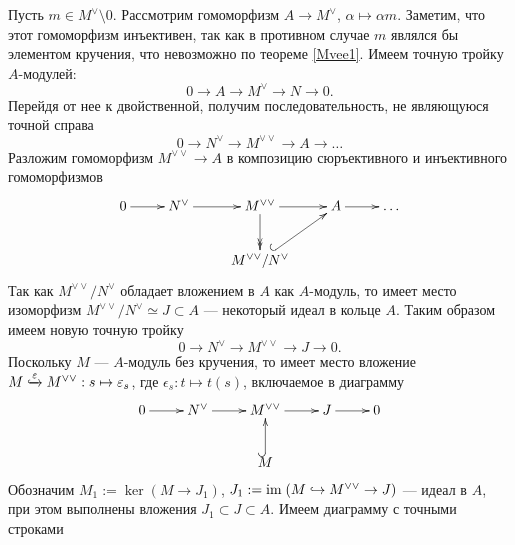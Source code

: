    Пусть $m \in M^{\vee} \setminus 0$. Рассмотрим гомоморфизм $A \rightarrow M^\vee$, $\alpha \mapsto \alpha m$.
    Заметим, что этот гомоморфизм инъективен, так как в противном случае $m$ являлся бы элементом 
    кручения, что невозможно по теореме \ref{Mvee1}. Имеем точную тройку $A$-модулей:
    \begin{equation*}
        0 \rightarrow A \rightarrow M^\vee \rightarrow N \rightarrow 0.
    \end{equation*}
    Перейдя от нее к двойственной, получим последовательность, не являющуюся точной справа
    \begin{equation*}
        0 \rightarrow N^\vee \rightarrow M^{\vee \vee} \rightarrow A \rightarrow \dots
    \end{equation*}
    Разложим гомоморфизм $M^{\vee \vee} \rightarrow A$ в композицию сюръективного и инъективного 
    гомоморфизмов
    \begin{equation*}
        \xymatrix{
            0 \ar[r]
            &N^\vee \ar[r] 
            &M^{\vee \vee} \ar[r] \ar@{>>}[d]
            &A \ar[r]
            &\dots \\
            &
            &
            M^{\vee \vee} / N^\vee \ar@{^{(}->}[ru]
        }
    \end{equation*}
    Так как $ M^{\vee \vee} / N^\vee$ обладает вложением в $A$ как $A$-модуль, то имеет место 
    изоморфизм  $ M^{\vee \vee} / N^\vee \simeq J \subset A$ --- некоторый идеал в кольце $A$. Таким 
    образом имеем новую точную тройку
    \begin{equation*}
        0 \rightarrow N^\vee \rightarrow M^{\vee \vee} \rightarrow J \rightarrow 0.
    \end{equation*}
    Поскольку $M$ --- $A$-модуль без кручения, то имеет место вложение \linebreak
    $ M \lhook\joinrel\xrightarrow{\epsilon} M^{\vee \vee} : s \mapsto \epsilon_s$, где $\epsilon_s : t \mapsto t(s)$, 
    включаемое в диаграмму
    \begin{equation*}
        \xymatrix{
            0 \ar[r]
            &N^\vee \ar[r] 
            &M^{\vee \vee} \ar[r] 
            &J \ar[r]
            &0\\
            &
            &M \ar@{^{(}->}[u]
        }
    \end{equation*}
    Обозначим $M_1 := \ker(M \rightarrow J_1)$, $J_1 := \textup{im\;}(M \hookrightarrow M^{\vee \vee} \rightarrow J)$ --- 
    идеал в $A$, при этом выполнены вложения $J_1 \subset J \subset A$. 
    Имеем диаграмму с точными строками
